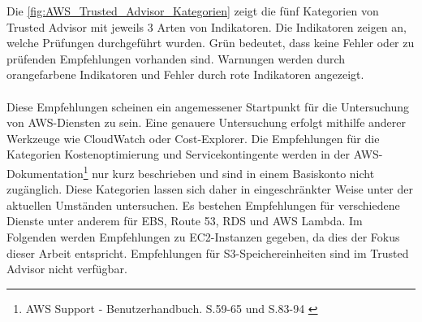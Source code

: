 Die \autoref{fig:AWS_Trusted_Advisor_Kategorien} zeigt die fünf Kategorien von Trusted Advisor mit jeweils 3 Arten von Indikatoren. Die Indikatoren zeigen an, welche Prüfungen durchgeführt wurden. Grün bedeutet, dass keine Fehler oder zu prüfenden Empfehlungen vorhanden sind. Warnungen werden durch orangefarbene Indikatoren und Fehler durch rote Indikatoren angezeigt. 
\\\\
Diese Empfehlungen scheinen ein angemessener Startpunkt für die Untersuchung von AWS-Diensten zu sein. Eine genauere Untersuchung erfolgt mithilfe anderer Werkzeuge wie CloudWatch oder Cost-Explorer.%
Die Empfehlungen für die Kategorien Kostenoptimierung und Servicekontingente werden in der AWS-Dokumentation\footnote{AWS Support - Benutzerhandbuch. S.59-65 und S.83-94 \cite{AMZ37}} nur kurz beschrieben und sind in einem Basiskonto nicht zugänglich. Diese Kategorien lassen sich daher in eingeschränkter Weise unter der aktuellen Umständen untersuchen.
%
Es bestehen Empfehlungen für verschiedene Dienste unter anderem für EBS, Route 53, RDS und AWS Lambda. Im Folgenden werden Empfehlungen zu EC2-Instanzen gegeben, da dies der Fokus dieser Arbeit entspricht. Empfehlungen für S3-Speichereinheiten sind im Trusted Advisor nicht verfügbar.

